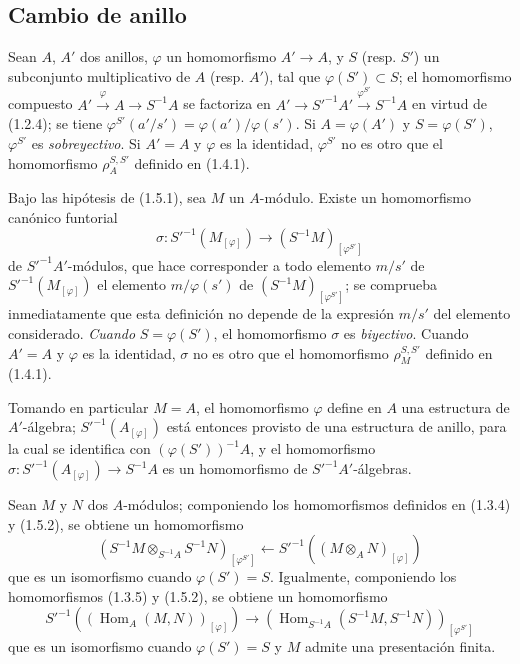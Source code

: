 \subsection{Cambio de anillo}
\label{subsection:0.1.5-fr}

\begin{env}[1.5.1]
\label{0.1.5.1-fr}
Sean $A$, $A'$ dos anillos, $\varphi$ un homomorfismo $A'\to A$, y $S$ (resp. $S'$) un subconjunto multiplicativo de $A$ (resp. $A'$), tal que $\varphi(S')\subset S$; el homomorfismo compuesto
$A'\xrightarrow{\varphi}A\longrightarrow S^{-1}A$
se factoriza en
$A'\longrightarrow S'^{-1}A'\xrightarrow{\varphi^{S'}}S^{-1}A$
en virtud de (1.2.4); se tiene $\varphi^{S'}(a'/s')=\varphi(a')/\varphi(s')$.
Si $A=\varphi(A')$ y $S=\varphi(S')$, $\varphi^{S'}$ es \emph{sobreyectivo}.
Si $A'=A$ y $\varphi$ es la identidad, $\varphi^{S'}$ no es otro que el homomorfismo $\rho_A^{S,S'}$ definido en (1.4.1).
\end{env}

\begin{env}[1.5.2]
\label{0.1.5.2-fr}
Bajo las hipótesis de (1.5.1), sea $M$ un $A$-módulo.
Existe un homomorfismo canónico funtorial
\[
  \sigma:S'^{-1}(M_{[\varphi]})\longrightarrow
  (S^{-1}M)_{[\varphi^{S'}]}
\]
de $S'^{-1}A'$-módulos, que hace corresponder a todo elemento $m/s'$ de $S'^{-1}(M_{[\varphi]})$ el elemento $m/\varphi(s')$ de $(S^{-1}M)_{[\varphi^{S'}]}$; se comprueba inmediatamente que esta definición no depende de la expresión $m/s'$ del elemento considerado.
\emph{Cuando} $S=\varphi(S')$, el homomorfismo $\sigma$ es \emph{biyectivo}.
Cuando $A'=A$ y $\varphi$ es la identidad, $\sigma$ no es otro que el homomorfismo $\rho_M^{S,S'}$ definido en (1.4.1).

Tomando en particular $M=A$, el homomorfismo $\varphi$ define en $A$ una estructura de $A'$-álgebra; $S'^{-1}(A_{[\varphi]})$ está entonces provisto de una estructura de anillo, para la cual se identifica con $(\varphi(S'))^{-1}A$, y el homomorfismo
$\sigma:S'^{-1}(A_{[\varphi]})\longrightarrow S^{-1}A$
es un homomorfismo de $S'^{-1}A'$-álgebras.
\end{env}

\begin{env}[1.5.3]
\label{0.1.5.3-fr}
Sean $M$ y $N$ dos $A$-módulos; componiendo los homomorfismos definidos en (1.3.4) y (1.5.2), se obtiene un homomorfismo
\[
  (S^{-1}M\otimes_{S^{-1}A}S^{-1}N)_{[\varphi^{S'}]}
  \longleftarrow
  S'^{-1}((M\otimes_A N)_{[\varphi]})
\]
que es un isomorfismo cuando $\varphi(S')=S$.
Igualmente, componiendo los homomorfismos (1.3.5) y (1.5.2), se obtiene un homomorfismo
\[
  S'^{-1}((\operatorname{Hom}_A(M,N))_{[\varphi]})
  \longrightarrow
  (\operatorname{Hom}_{S^{-1}A}(S^{-1}M,S^{-1}N))_{[\varphi^{S'}]}
\]
que es un isomorfismo cuando $\varphi(S')=S$ y $M$ admite una presentación finita.
\end{env}

